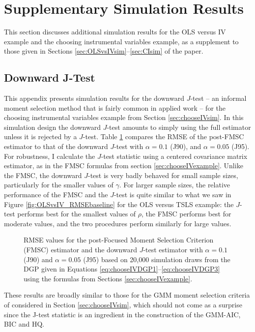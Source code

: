 \section{Supplementary Simulation Results}
\label{sec:simsupplement}
This section discusses additional simulation results for the OLS versus IV example and the choosing instrumental variables example, as a supplement to those given in Sections \ref{sec:OLSvsIVsim}--\ref{sec:CIsim} of the paper.

\subsection{Downward J-Test}
\label{sec:downwardJ}
This appendix presents simulation results for the downward $J$-test -- an informal moment selection method that is fairly common in applied work -- for the choosing instrumental variables example from Section \ref{sec:chooseIVsim}.
In this simulation design the downward $J$-test amounts to simply using the full estimator unless it is rejected by a $J$-test.
Table \ref{fig:chooseIVsim_RMSErelJ} compares the RMSE of the post-FMSC estimator to that of the downward $J$-test with $\alpha = 0.1$ (J90), and $\alpha = 0.05$ (J95).
For robustness, I calculate the $J$-test statistic using a centered covariance matrix estimator, as in the FMSC formulas from section \ref{sec:chooseIVexample}.
Unlike the FMSC, the downward $J$-test is very badly behaved for small sample sizes, particularly for the smaller values of $\gamma$.
For larger sample sizes, the relative performance of the FMSC and the $J$-test is quite similar to what we saw in Figure \ref{fig:OLSvsIV_RMSEbaseline} for the OLS versus TSLS example: the $J$-test performs best for the smallest values of $\rho$, the FMSC performs best for moderate values, and the two procedures perform similarly for large values.
\begin{figure}
\centering
	
	\caption{RMSE values for the post-Focused Moment Selection Criterion (FMSC) estimator and the downward $J$-test estimator with $\alpha = 0.1$ (J90) and $\alpha = 0.05$ (J95) based on 20,000 simulation draws from the DGP given in Equations \ref{eq:chooseIVDGP1}--\ref{eq:chooseIVDGP3} using the formulas from Sections \ref{sec:chooseIVexample}.}
	\label{fig:chooseIVsim_RMSErelJ}
\end{figure}
These results are broadly similar to those for the GMM moment selection criteria of \cite{Andrews1999} considered in Section \ref{sec:chooseIVsim}, which should not come as a surprise since the J-test statistic is an ingredient in the construction of the GMM-AIC, BIC and HQ. 

